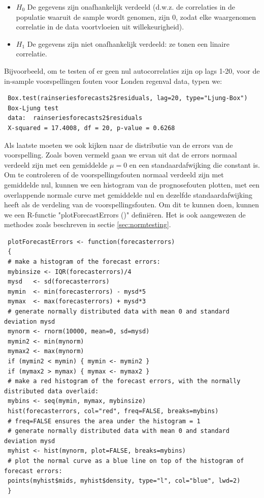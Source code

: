 \begin{itemize}
	\item $H_0$ De gegevens zijn onafhankelijk verdeeld (d.w.z. de correlaties in de populatie waaruit de sample wordt genomen, zijn 0, zodat elke waargenomen correlatie in de data voortvloeien uit willekeurigheid).
	\item $H_1$ De gegevens zijn niet onafhankelijk verdeeld: ze tonen een linaire correlatie.
\end{itemize}

 Bijvoorbeeld, om te testen of er geen nul autocorrelaties zijn op lags 1-20, voor de in-sample voorspellingen fouten voor Londen regenval data, typen we:
 \begin{lstlisting}
 Box.test(rainseriesforecasts2$residuals, lag=20, type="Ljung-Box")
 Box-Ljung test
 data:  rainseriesforecasts2$residuals
 X-squared = 17.4008, df = 20, p-value = 0.6268
 \end{lstlisting}
 
 Als laatste moeten we ook kijken naar de distributie van de errors van de voorspelling. Zoals boven vermeld gaan we ervan uit dat de errors normaal verdeeld zijn met een gemiddelde $\mu = 0$ en een standaardafwijking die constant is. Om te controleren of de voorspellingsfouten normaal verdeeld zijn met gemiddelde nul, kunnen we een histogram van de prognosefouten plotten, met een overlappende normale curve met gemiddelde nul en dezelfde standaardafwijking heeft als de verdeling van de voorspellingsfouten. Om dit te kunnen doen, kunnen we een R-functie "plotForecastErrors ()" definiëren. Het is ook aangewezen de methodes zoals beschreven in sectie \ref{sec:normtesting}.
 
 \begin{lstlisting}
 plotForecastErrors <- function(forecasterrors)
 {
 # make a histogram of the forecast errors:
 mybinsize <- IQR(forecasterrors)/4
 mysd   <- sd(forecasterrors)
 mymin  <- min(forecasterrors) - mysd*5
 mymax  <- max(forecasterrors) + mysd*3
 # generate normally distributed data with mean 0 and standard deviation mysd
 mynorm <- rnorm(10000, mean=0, sd=mysd)
 mymin2 <- min(mynorm)
 mymax2 <- max(mynorm)
 if (mymin2 < mymin) { mymin <- mymin2 }
 if (mymax2 > mymax) { mymax <- mymax2 }
 # make a red histogram of the forecast errors, with the normally distributed data overlaid:
 mybins <- seq(mymin, mymax, mybinsize)
 hist(forecasterrors, col="red", freq=FALSE, breaks=mybins)
 # freq=FALSE ensures the area under the histogram = 1
 # generate normally distributed data with mean 0 and standard deviation mysd
 myhist <- hist(mynorm, plot=FALSE, breaks=mybins)
 # plot the normal curve as a blue line on top of the histogram of forecast errors:
 points(myhist$mids, myhist$density, type="l", col="blue", lwd=2)
 }
 \end{lstlisting}

